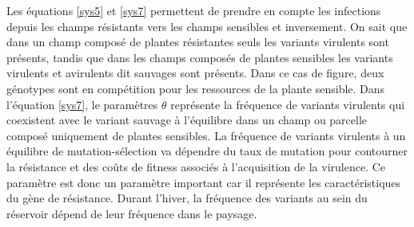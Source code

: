 	 Les équations \eqref{sys5} et \eqref{sys7}  permettent de prendre en compte les infections depuis les champs résistants vers les champs sensibles  et inversement. On sait que dans un champ composé de plantes résistantes seuls les variants virulents sont présents, tandis que dans les champs composés de plantes sensibles les variants virulents et avirulents dit \og sauvages \fg sont présents. Dans ce cas de figure, deux génotypes sont en compétition pour les ressources de la plante sensible. Dans l'équation \eqref{sys7}, le paramètres $\theta$ représente la fréquence de variants virulents qui coexistent avec le variant sauvage  à l'équilibre dans un champ ou parcelle composé uniquement de plantes sensibles. La fréquence de variants virulents à un équilibre de \og mutation-sélection \fg va dépendre du taux de mutation pour contourner la résistance et des coûts de fitness associés à l'acquisition de la virulence. Ce paramètre est donc un paramètre important car il représente les caractéristiques du gène de résistance.   
Durant l'hiver, la fréquence des variants au sein du  réservoir dépend de leur fréquence dans le paysage.
	
